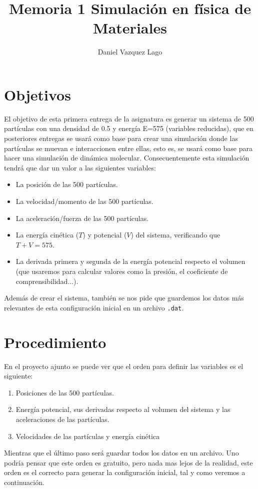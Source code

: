 \documentclass[11pt]{article}
\author{Daniel Vazquez Lago}
\title{Memoria 1 Simulación en física de Materiales}
\begin{document}
\maketitle
\newpage

\tableofcontents


\section{Objetivos}

El objetivo de esta primera entrega de la asignatura es generar un sistema de 500 partículas con una densidad de 0.5 y energía E=575 (variables reducidas), que en posteriores entregas se usará como base para crear una simulación donde las partículas se muevan e interaccionen entre ellas, esto es, se usará como base para hacer una simulación de dinámica molecular. Consecuentemente esta simulación tendrá que dar un valor a las siguientes variables:

\begin{itemize}
	\item La posición de las 500 partículas.
	\item La velocidad/momento de las 500 partículas.
	\item La aceleración/fuerza de las 500 partículas.
	\item La energía cinética ($T$) y potencial ($V$) del sistema, verificando que $T+V=575$.
	\item La derivada primera y segunda de la energía potencial respecto el volumen (que usaremos para calcular valores como la presión, el coeficiente de comprensibilidad...).
\end{itemize}
Además de crear el sistema, también se nos pide que guardemos los datos más relevantes de esta configuración inicial en un archivo \texttt{.dat}. 

\section{Procedimiento} \label{Sec:02}

En el proyecto ajunto se puede ver que el orden para definir las variables es el siguiente: 

\begin{enumerate}
	\item Posiciones de las 500 partículas.
	\item Energía potencial, sus derivadas respecto al volumen del sistema y las aceleraciones de las partículas. 
	\item Velocidades de las partículas y energía cinética
\end{enumerate}
Mientras que el último paso será guardar todos los datos en un archivo. Uno podría pensar que este orden es gratuito, pero nada mas lejos de la realidad, este orden es el correcto para generar la configuración inicial, tal y como veremos a continuación. \\
\end{document}
